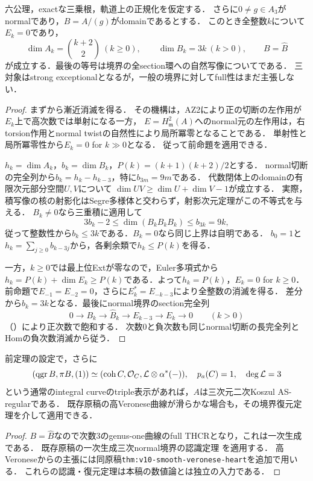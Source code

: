 \documentclass[11pt,a4paper]{ltjsarticle}
\begin{document}
\begin{theorem}[三次normal境界における全消滅]\label{thm:cubic-vanishing}
六公理，exactな三乗根，軌道上の正規化を仮定する．
さらに$0\ne g\in A_3$がnormalであり，$B=A/(g)$がdomainであるとする．
このとき全整数$k$について$E_k=0$であり，
\[
 \dim A_k=\binom{k+2}{2}\ (k\ge0),\qquad
 \dim B_k=3k\ (k>0),\qquad B=\widehat B
\]
が成立する．最後の等号は境界の全section環への自然写像についてである．
三対象はstrong exceptionalとなるが，一般の境界に対してfull性はまだ主張しない．
\end{theorem}
\begin{proof}
まず\cite[\texttt{prop:normal-vanishing}]{Companion}から漸近消滅を得る．
その機構は，AZ2により正の切断の左作用が$E_k$上で高次数では単射になる一方，
$E=H^2_{\mathfrak m}(A)$へのnormal元の左作用は，右torsion作用とnormal twistの自然性により局所冪零となることである．
単射性と局所冪零性から$E_k=0$ for $k\gg0$となる．
従って前命題を適用できる．

$h_k=\dim A_k$，$b_k=\dim B_k$，$P(k)=(k+1)(k+2)/2$とする．
normal切断の完全列から$b_k=h_k-h_{k-3}$，特に$b_{3m}=9m$である．
代数閉体上のdomainの有限次元部分空間$U,V$について
$\dim UV\ge\dim U+\dim V-1$が成立する．
実際，積写像の核の射影化はSegre多様体と交わらず，射影次元定理がこの不等式を与える．
$B_k\ne0$なら三重積に適用して
\[
 3b_k-2\le\dim(B_kB_kB_k)\le b_{3k}=9k,
\]
従って整数性から$b_k\le3k$である．$B_k=0$なら同じ上界は自明である．
$b_0=1$と$h_k=\sum_{j\ge0}b_{k-3j}$から，各剰余類で$h_k\le P(k)$を得る．

一方，$k\ge0$では最上位Extが零なので，Euler多項式から
$h_k=P(k)+\dim E_k\ge P(k)$である．よって$h_k=P(k)$，$E_k=0$ for $k\ge0$．
前命題で$E_{-1}=E_{-2}=0$，さらに$E_k^*=E_{-k-3}$により全整数の消滅を得る．
差分から$b_k=3k$となる．最後にnormal境界のsection完全列
\[
 0\to B_k\to\widehat B_k\to E_{k-3}\to E_k\to0\qquad(k>0)
\]
（\cite[\texttt{cor:cubic-boundary-duality}]{Companion}）により正次数で飽和する．
次数0と負次数も同じnormal切断の長完全列とHomの負次数消滅から従う．
\end{proof}

\begin{corollary}[通常の曲線境界を持つ正規化coindex零の認識]\label{cor:recognition}
前定理の設定で，さらに
\[
 (\operatorname{qgr} B,\pi B,(1))\simeq
 (\operatorname{coh} C,\mathcal O_C,\mathcal L\otimes\alpha^*(-)),
 \quad p_a(C)=1,\quad\deg\mathcal L=3
\]
という通常のintegral curveのtriple表示があれば，$A$は三次元二次Koszul AS-regularである．
既存原稿の高Veronese曲線が滑らかな場合も，その境界復元定理を介して適用できる．
\end{corollary}
\begin{proof}
$B=\widehat B$なので次数3のgenus-one曲線のfull THCRとなり，これは一次生成である．
既存原稿の一次生成三次normal境界の認識定理
\cite[\texttt{thm:cubic-generated-boundary-recognition}]{Companion}を適用する．
高Veroneseからの主張には同原稿\texttt{thm:v10-smooth-veronese-heart}を追加で用いる．
これらの認識・復元定理は本稿の数値論とは独立の入力である．
\end{proof}
\end{document}
